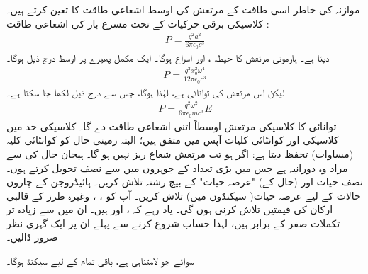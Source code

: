 موازنہ کی خاطر اسی طاقت کے   مرتعش کی  اوسط اشعاعی  طاقت کا  تعین کرتے ہیں۔ کلاسیکی برقی حرکیات کے تحت مسرع بار  کی  اشعاعی  طاقت  :
\begin{align}
	P = \frac{q^2a^2}{6\pi\epsilon_0c^3}
\end{align}
  دیتا ہے۔ ہارمونی مرتعش   کا حیطہ ،   اور  اسراع   ہوگا۔  ایک مکمل  پھیرے  پر   اوسط درج ذیل ہوگا۔
\begin{align*}
	P = \frac{q^2x^2_0\omega^4}{12\pi\epsilon_0c^3}
\end{align*}
لیکن اس مرتعش کی توانائی  ہے،  لہٰذا  ہوگا،  جس سے درج ذیل لکھا جا سکتا ہے۔
\begin{align}
	P = \frac{q^2\omega^2}{6\pi\epsilon_0mc^3}E
\end{align}
توانائی  کا کلاسیکی مرتعش اوسطاً اتنی اشعاعی  طاقت  دے گا۔ کلاسیکی حد  میں کلاسیکی اور کوانٹائی کلیات آپس میں متفق ہیں؛   البتہ زمینی حال کو کوانٹائی کلیہ
 (مساوات)   تحفظ  دیتا ہے: اگر  ہو تب مرتعش شعاع ریز نہیں ہو  گا۔
ہیجان حال کی    سے مراد وہ دورانیہ ہے جس میں بڑی تعداد کے جوہروں میں سے نصف تحویل کرتے ہوں۔ نصف حیات  اور  (حال کے)  "عرصہ حیات"     کے بیچ رشتہ تلاش کریں۔
ہائیڈروجن کے چاروں  حالات کے لیے عرصہ حیات(  سیکنڈوں میں) تلاش کریں۔   آپ کو  ،    ،  وغیرہ   طرز کے قالبی ارکان کی قیمتیں تلاش کرنی ہوں گی۔ یاد رہے کہ
 ،    اور   ہیں۔ ان میں سے زیادہ تر تکملات صفر کے برابر  ہیں، لہٰذا حساب شروع کرنے سے پہلے ان پر ایک گہری نظر ضرور ڈالیں۔

  سوائے  جو لامتناہی ہے،  باقی تمام کے لیے  سیکنڈ  ہوگا۔



